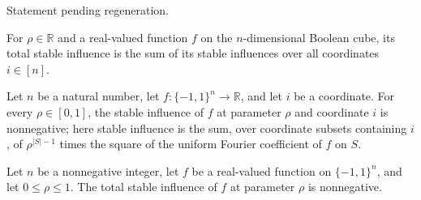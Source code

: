 \begin{theorem}
\label{FABL.stableInfluence_eq_noiseStability_discreteDerivative}
\leanok
{}
Statement pending regeneration.
\end{theorem}

\begin{definition}
\label{FABL.totalStableInfluence}
\leanok
{}
For $\rho\in\mathbb{R}$ and a real-valued function $f$ on the $n$-dimensional Boolean
cube, its total stable influence is the sum of its stable influences over all
coordinates $i\in[n]$.
\end{definition}

\begin{theorem}
\label{FABL.stableInfluence_nonneg}
\leanok
{}
Let $n$ be a natural number, let $f:\{−1,1\}^n\to\mathbb R$, and let $i$ be a
coordinate. For every $\rho\in[0,1]$, the stable influence of $f$ at parameter $\rho$
and coordinate $i$ is nonnegative; here stable influence is the sum, over coordinate
subsets containing $i$, of $\rho^{|S|-1}$ times the square of the uniform Fourier
coefficient of $f$ on $S$.
\end{theorem}

\begin{theorem}
\label{FABL.totalStableInfluence_nonneg}
\leanok
{}
Let $n$ be a nonnegative integer, let $f$ be a real-valued function on $\{-1,1\}^n$,
and let $0\le\rho\le 1$. The total stable influence of $f$ at parameter $\rho$ is
nonnegative.
\end{theorem}

